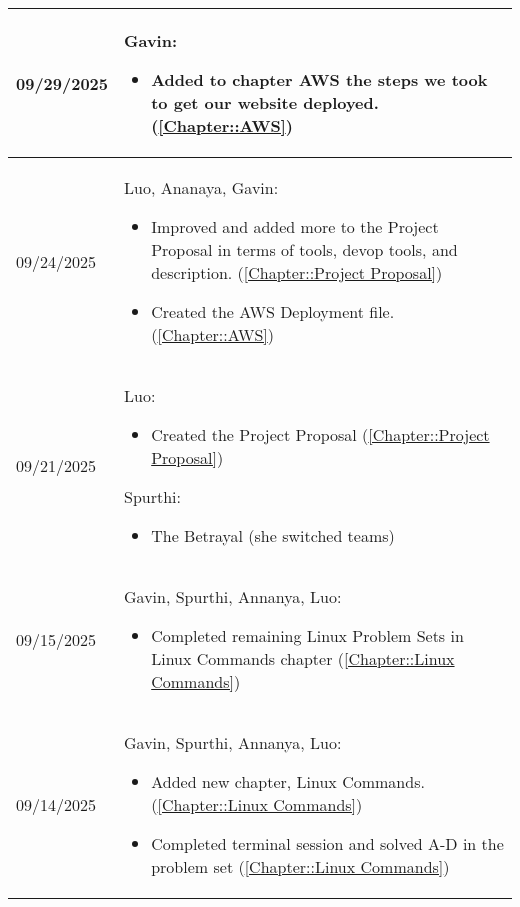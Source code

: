 \begin{longtable}{|l||p{13.5cm}|}
09/29/2025 & Gavin:
\begin{itemize}[topsep=0pt,itemsep=0pt,parsep=0pt,partopsep=0pt,leftmargin=12pt]
\item Added to chapter AWS the steps we took to get our website deployed. (\ref{Chapter::AWS})
\end{itemize} 
\\ \hline

09/24/2025 & Luo, Ananaya, Gavin:
\begin{itemize}[topsep=0pt,itemsep=0pt,parsep=0pt,partopsep=0pt,leftmargin=12pt]
\item Improved and added more to the Project Proposal in terms of tools, devop tools, and description. (\ref{Chapter::Project Proposal})
\item Created the AWS Deployment file. (\ref{Chapter::AWS})
\end{itemize} 
\\ \hline

09/21/2025 & Luo:
\begin{itemize}[topsep=0pt,itemsep=0pt,parsep=0pt,partopsep=0pt,leftmargin=12pt]
\item Created the Project Proposal (\ref{Chapter::Project Proposal})
\end{itemize} 
Spurthi:
\begin{itemize}[topsep=0pt,itemsep=0pt,parsep=0pt,partopsep=0pt,leftmargin=12pt]
\item The Betrayal (she switched teams)
\end{itemize} 
\\ \hline

09/15/2025 & Gavin, Spurthi, Annanya, Luo:
\begin{itemize}[topsep=0pt,itemsep=0pt,parsep=0pt,partopsep=0pt,leftmargin=12pt]
\item Completed remaining Linux Problem Sets in Linux Commands chapter (\ref{Chapter::Linux Commands})
\end{itemize} 
\\ \hline

09/14/2025 & Gavin, Spurthi, Annanya, Luo:
\begin{itemize}[topsep=0pt,itemsep=0pt,parsep=0pt,partopsep=0pt,leftmargin=12pt]
\item Added new chapter, Linux Commands. (\ref{Chapter::Linux Commands})
\item Completed terminal session and solved A-D in the problem set  (\ref{Chapter::Linux Commands})
\end{itemize} 
\\ \hline




\end{longtable}

